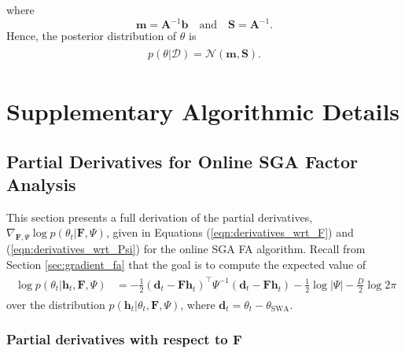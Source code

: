 \documentclass[msc,deptreport.inf]{infthesis} %
\newcommand{\matr}[1]{\mathbf{#1}}
\begin{document}
where
\begin{equation}
	\matr{m} = \matr{A}^{-1} \matr{b}
	\quad \text{and} \quad 
	\matr{S} = \matr{A}^{-1}.
\end{equation}
Hence, the posterior distribution of $\theta$ is 
\begin{align}
\begin{split}
	p(\theta | \mathcal{D}) = \mathcal{N}(\matr{m}, \matr{S}).
\end{split}
\end{align}

 \chapter{Supplementary Algorithmic Details}

\section{Partial Derivatives for Online SGA Factor Analysis}\label{app:online_fa_sga_derivatives}

This section presents a full derivation of the partial derivatives, $\nabla_{\matr{F}, \Psi} \log p(\theta_t | \matr{F}, \Psi)$, given in Equations (\ref{eqn:derivatives_wrt_F}) and (\ref{eqn:derivatives_wrt_Psi}) for the online SGA FA algorithm. Recall from Section \ref{sec:gradient_fa} that the goal is to compute the expected value of 
\begin{align}\label{eqn:log_fa_cond_dist_app}
\begin{split}
	\log p(\theta_t | \matr{h}_t, \matr{F}, \Psi)
	& = -\frac{1}{2} (\matr{d}_t - \matr{Fh}_t)^\intercal \Psi^{-1} (\matr{d}_t - \matr{Fh}_t) - \frac{1}{2} \log |\Psi| - \frac{D}{2} \log 2\pi
\end{split}
\end{align}
over the distribution $p(\matr{h}_t | \theta_t, \matr{F}, \Psi)$, where $\matr{d}_t = \theta_t - \theta_{\text{SWA}}$.

\subsection{Partial derivatives with respect to $\matr{F}$}
\end{document}
